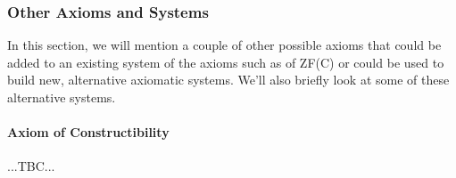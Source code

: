 






\subsubsection{Other Axioms and Systems}
In this section, we will mention a couple of other possible axioms that could be added to an existing system of the axioms such as of ZF(C) or could be used to build new, alternative axiomatic systems. We'll also briefly look at some of these alternative systems.

\paragraph{Axiom of Constructibility} ...TBC...









